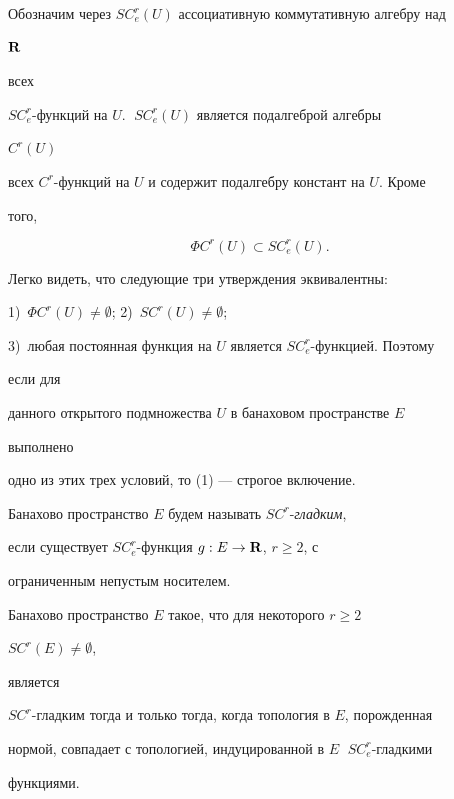 Обозначим через $SC^r_e(U)$ ассоциативную коммутативную алгебру над


$\bold R$


всех


$SC^r_e$-функций на $U$. $\;SC^r_e(U)$ является подалгеброй алгебры


$C^r(U)$


всех $C^r$-функций на $U$ и содержит подалгебру констант на $U$. Кроме


того,


\begin{equation}


\Phi C^r(U)\subset SC^r_e(U).


\end{equation}





Легко видеть, что следующие три утверждения эквивалентны:


1)~$\Phi C^r(U)\ne\emptyset$; 2)~$SC^r(U)\ne\emptyset$;


3)~любая постоянная функция на $U$ является $SC^r_e$-функцией. Поэтому


если для


данного открытого подмножества $U$ в банаховом пространстве $E$


выполнено


одно из этих трех условий, то (1) --- строгое включение.





\begin{defns}


Банахово пространство $E$ будем называть $SC^r$-{\em гладким},


если существует $SC^r_e$-функция $g:E\to\bold R$, $r\ge 2$, с


ограниченным непустым носителем.


\end{defns}





\begin{thms}


Банахово пространство $E$ такое, что для некоторого $r\ge 2\;$


$SC^r(E)\ne\emptyset$,


является


$SC^r$-гладким тогда и только тогда, когда топология в $E$, порожденная


нормой, совпадает с топологией, индуцированной в $E\;$ $SC^r_e$-гладкими


функциями.


\end{thms}





